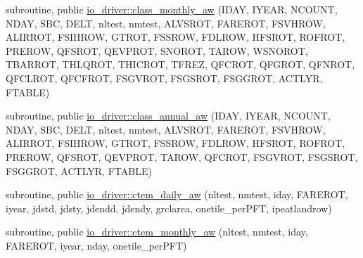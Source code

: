 {\bf }\par
\begin{DoxyCompactItemize}
\item 
subroutine, public \hyperlink{group__io__driver__class__monthly__aw_ga58c2e12621635a74096a8f7c142f85de}{io\+\_\+driver\+::class\+\_\+monthly\+\_\+aw} (I\+D\+A\+Y, I\+Y\+E\+A\+R, N\+C\+O\+U\+N\+T, N\+D\+A\+Y, S\+B\+C, D\+E\+L\+T, nltest, nmtest, A\+L\+V\+S\+R\+O\+T, F\+A\+R\+E\+R\+O\+T, F\+S\+V\+H\+R\+O\+W, A\+L\+I\+R\+R\+O\+T, F\+S\+I\+H\+R\+O\+W, G\+T\+R\+O\+T, F\+S\+S\+R\+O\+W, F\+D\+L\+R\+O\+W, H\+F\+S\+R\+O\+T, R\+O\+F\+R\+O\+T, P\+R\+E\+R\+O\+W, Q\+F\+S\+R\+O\+T, Q\+E\+V\+P\+R\+O\+T, S\+N\+O\+R\+O\+T, T\+A\+R\+O\+W, W\+S\+N\+O\+R\+O\+T, T\+B\+A\+R\+R\+O\+T, T\+H\+L\+Q\+R\+O\+T, T\+H\+I\+C\+R\+O\+T, T\+F\+R\+E\+Z, Q\+F\+C\+R\+O\+T, Q\+F\+G\+R\+O\+T, Q\+F\+N\+R\+O\+T, Q\+F\+C\+L\+R\+O\+T, Q\+F\+C\+F\+R\+O\+T, F\+S\+G\+V\+R\+O\+T, F\+S\+G\+S\+R\+O\+T, F\+S\+G\+G\+R\+O\+T, A\+C\+T\+L\+Y\+R, F\+T\+A\+B\+L\+E)
\end{DoxyCompactItemize}

{\bf }\par
\begin{DoxyCompactItemize}
\item 
subroutine, public \hyperlink{group__io__driver__class__annual__aw_gaa89ed6fc9e92f8b96f493efb9f0e345c}{io\+\_\+driver\+::class\+\_\+annual\+\_\+aw} (I\+D\+A\+Y, I\+Y\+E\+A\+R, N\+C\+O\+U\+N\+T, N\+D\+A\+Y, S\+B\+C, D\+E\+L\+T, nltest, nmtest, A\+L\+V\+S\+R\+O\+T, F\+A\+R\+E\+R\+O\+T, F\+S\+V\+H\+R\+O\+W, A\+L\+I\+R\+R\+O\+T, F\+S\+I\+H\+R\+O\+W, G\+T\+R\+O\+T, F\+S\+S\+R\+O\+W, F\+D\+L\+R\+O\+W, H\+F\+S\+R\+O\+T, R\+O\+F\+R\+O\+T, P\+R\+E\+R\+O\+W, Q\+F\+S\+R\+O\+T, Q\+E\+V\+P\+R\+O\+T, T\+A\+R\+O\+W, Q\+F\+C\+R\+O\+T, F\+S\+G\+V\+R\+O\+T, F\+S\+G\+S\+R\+O\+T, F\+S\+G\+G\+R\+O\+T, A\+C\+T\+L\+Y\+R, F\+T\+A\+B\+L\+E)
\end{DoxyCompactItemize}

{\bf }\par
\begin{DoxyCompactItemize}
\item 
subroutine, public \hyperlink{group__io__driver__ctem__daily__aw_gaabb54fc6376839cc19d2b3591a963802}{io\+\_\+driver\+::ctem\+\_\+daily\+\_\+aw} (nltest, nmtest, iday, F\+A\+R\+E\+R\+O\+T, iyear, jdstd, jdsty, jdendd, jdendy, grclarea, onetile\+\_\+per\+P\+F\+T, ipeatlandrow)
\end{DoxyCompactItemize}

{\bf }\par
\begin{DoxyCompactItemize}
\item 
subroutine, public \hyperlink{group__io__driver__ctem__monthly__aw_gaefba66acca4c5138cfa2500f7a030022}{io\+\_\+driver\+::ctem\+\_\+monthly\+\_\+aw} (nltest, nmtest, iday, F\+A\+R\+E\+R\+O\+T, iyear, nday, onetile\+\_\+per\+P\+F\+T)
\end{DoxyCompactItemize}

